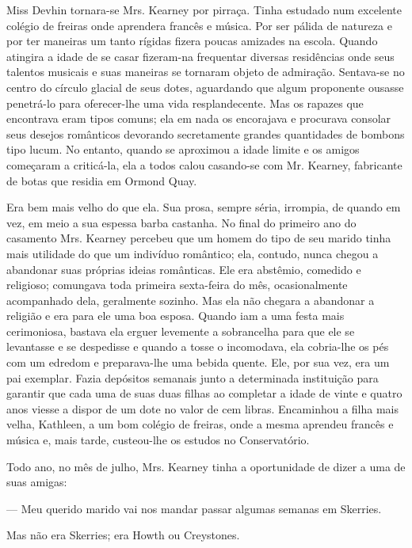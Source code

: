 Miss Devhin tornara-se Mrs. Kearney por pirraça. Tinha estudado num
excelente colégio de freiras onde aprendera francês e música. Por ser
pálida de natureza e por ter maneiras um tanto rígidas fizera poucas
amizades na escola. Quando atingira a idade de se casar fizeram-na
frequentar diversas residências onde seus talentos musicais e suas
maneiras se tornaram objeto de admiração. Sentava-se no centro do
círculo glacial de seus dotes, aguardando que algum proponente
ousasse penetrá-lo para oferecer-lhe uma vida resplandecente. Mas os
rapazes que encontrava eram tipos comuns; ela em nada os encorajava e
procurava consolar
seus desejos românticos devorando secretamente grandes quantidades
de bombons tipo lucum. No entanto, quando se aproximou a idade
limite e os amigos começaram a criticá-la, ela a todos calou
casando-se com Mr. Kearney, fabricante de botas que residia em Ormond
Quay.

Era bem mais velho do que ela. Sua prosa, sempre séria, irrompia, de
quando em vez, em meio a sua espessa barba castanha. No final do
primeiro ano do casamento Mrs. Kearney percebeu que um homem do
tipo de seu marido tinha mais utilidade do que um indivíduo romântico;
ela, contudo, nunca chegou a abandonar suas próprias ideias
românticas. Ele era abstêmio, comedido e religioso;
comungava toda primeira sexta-feira do mês, ocasionalmente
acompanhado dela, geralmente sozinho. Mas ela não chegara a
abandonar a religião e era para ele uma boa esposa. Quando iam a uma
festa mais cerimoniosa, bastava ela erguer levemente a sobrancelha
para que ele se levantasse e se despedisse e quando a tosse o
incomodava, ela cobria-lhe os pés com um edredom e preparava-lhe uma
bebida quente. Ele, por sua vez, era um pai exemplar. Fazia depósitos
semanais junto a determinada instituição para garantir que cada uma de
suas duas filhas ao completar a idade de vinte e quatro anos viesse a
dispor de um dote no valor de cem libras. Encaminhou a filha mais
velha, Kathleen, a um bom colégio de freiras, onde a mesma aprendeu
francês e música e, mais tarde, custeou-lhe os estudos no
Conservatório.

Todo ano, no mês de julho, Mrs. Kearney tinha a oportunidade de dizer
a uma de suas amigas:

--- Meu querido marido vai nos mandar passar algumas semanas em
Skerries.

Mas não era Skerries; era Howth ou Creystones.

